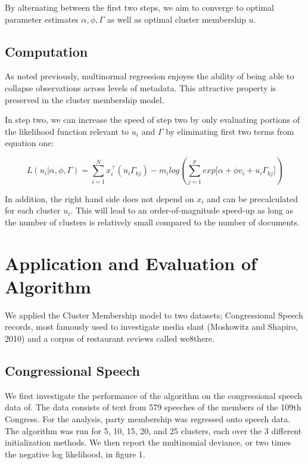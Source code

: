 \documentclass[12pt]{article}
\begin{document}
By alternating between the first two steps, we aim to converge to optimal
parameter estimates $\alpha, \phi, \Gamma$ as well as optimal cluster
membership $u$.
\subsection{Computation}\label{computation}
As noted previously, multinormal regression enjoyes the ability of being able to
collapse observations across levels of metadata. This attractive
property is preserved in the cluster membership model.

In step two, we can increase the speed of step two by only evaluating portions of the likelihood function relevant to $u_i$ and $\Gamma$ by eliminating first two terms from equation one:

\begin{equation} 
L(u_i|\alpha,\phi,\Gamma) = \sum_{i = 1}^{N}{ x_i^\top (u_i \Gamma_{kj})} - m_i log(\sum_{j = 1}^{p}{exp{\big[ \alpha + \phi v_i + u_i \Gamma_{kj} \big]}})
\end{equation}

In addition, the right hand side does not depend on $x_i$ and can be precalculated for each cluster $u_i$. This will lead to an order-of-magnitude speed-up as long as the number of clusters is relatively small compared to the number of documents. 



\section{Application and Evaluation of Algorithm}\label{application}

We applied the Cluster Membership model to two datasets; Congressional Speech records, most famously used to investigate media slant (Moskowitz and Shapiro, 2010) and a corpus of restaurant reviews called we8there.

\subsection{Congressional Speech} 

We first investigate the performance of the algorithm on the congressional speech data of. The data consists of text from 579 speeches of the members of the 109th Congress. For the analysis, party membership was regressed onto speech data. The algorithm was run for 5, 10, 15, 20, and 25 clusters, each over the 3 different initialization methods. We then report the multinomial deviance, or two times the negative log likelihood, in figure 1. 
\end{document}
